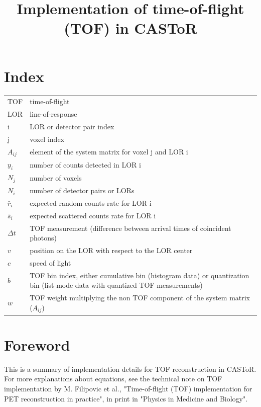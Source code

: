 \documentclass[a4paper, 11pt]{article}
\begin{document}
\title{Implementation of time-of-flight (TOF) in CASToR}
\maketitle

\section{Index}

\noindent
\begin{tabularx}{\linewidth}{p{3cm}X}
TOF & time-of-flight \\
LOR & line-of-response \\
i & LOR or detector pair index \\
j & voxel index \\
$A_{ij}$ & element of the system matrix for voxel j and LOR i \\
$y_i$ & number of counts detected in LOR i \\
$N_j$ & number of voxels \\
$N_i$ & number of detector pairs or LORs \\
$\bar{r}_i$ & expected random counts rate for LOR i \\
$\bar{s}_i$ & expected scattered counts rate for LOR i \\
$\Delta t$ & TOF measurement (difference between arrival times of coincident photons)\\
$v$ & position on the LOR with respect to the LOR center\\
$c$ & speed of light\\
$b$ & TOF bin index, either cumulative bin (histogram data) or quantization bin (list-mode data with quantized TOF measurements)\\
$w$ & TOF weight multiplying the non TOF component of the system matrix ($A_{ij}$)
\end{tabularx}


\section{Foreword}

This is a summary of implementation details for TOF reconstruction in CASToR. For more explanations about equations, see the technical note on TOF implementation by M. Filipovic et al., "Time-of-flight (TOF) implementation for PET reconstruction in practice", in print in "Physics in Medicine and Biology".
\end{document}
